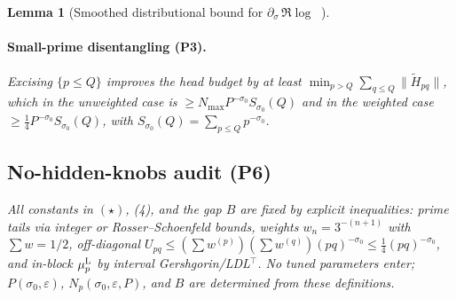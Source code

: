 \documentclass[11pt]{article}
\newtheorem{lemma}[theorem]{Lemma}
\theoremstyle{definition}
\theoremstyle{remark}
\DeclareMathOperator{\dettwo}{det_2}
\begin{document}
\begin{lemma}[Smoothed distributional bound for $\partial_\sigma\,\Re\log\dettwo$]
\paragraph{Small-prime disentangling (P3).}
Excising $\{p\le Q\}$ improves the head budget by at least $\min_{p>Q}\sum_{q\le Q}\|\widetilde H_{pq}\|$, which in the unweighted case is $\ge N_{\max} P^{-\sigma_0} S_{\sigma_0}(Q)$ and in the weighted case $\ge \tfrac14 P^{-\sigma_0} S_{\sigma_0}(Q)$, with $S_{\sigma_0}(Q)=\sum_{p\le Q}p^{-\sigma_0}$.

\subsection*{No-hidden-knobs audit (P6)}
All constants in $(\star)$, (4), and the gap $B$ are fixed by explicit inequalities: prime tails via integer or Rosser--Schoenfeld bounds, weights $w_n=3^{-(n+1)}$ with $\sum w=1/2$, off-diagonal $U_{pq}\le (\sum w^{(p)})(\sum w^{(q)})(pq)^{-\sigma_0}\le \tfrac14 (pq)^{-\sigma_0}$, and in-block $\mu_p^{\rm L}$ by interval Gershgorin/LDL$^\top$. No tuned parameters enter; $P(\sigma_0,\varepsilon)$, $N_p(\sigma_0,\varepsilon,P)$, and $B$ are determined from these definitions.


\end{lemma}
\end{document}

